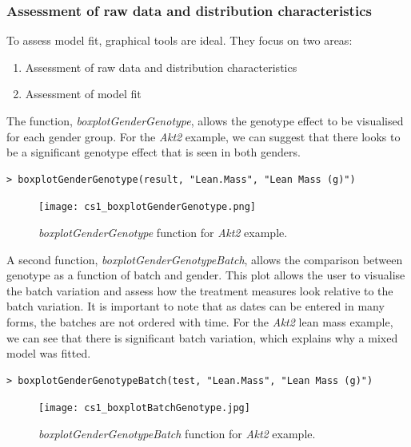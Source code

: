 \documentclass[12pt,a4paper]{article}
\begin{document}
\subsubsection{Assessment of raw data and distribution characteristics}
To assess model fit, graphical tools are ideal.  They focus on two areas:
\begin{enumerate}
 \item Assessment of raw data and distribution characteristics
 \item Assessment of model fit
\end{enumerate}
\label{AssesingModelFit}

The function, \textit{boxplotGenderGenotype}, allows the genotype effect to be visualised for each gender group. 
For the \textit{Akt2} example, we can suggest that there looks to be a significant genotype effect that is seen in both genders. 
\begingroup
    \fontsize{8pt}{12pt}\selectfont
\begin{verbatim}
> boxplotGenderGenotype(result, "Lean.Mass", "Lean Mass (g)")
\end{verbatim}
\endgroup 

\begin{figure}[H]%
\centerline{\texttt{[image: cs1\_boxplotGenderGenotype.png]}}
\caption{\textit{boxplotGenderGenotype} function for \textit{Akt2} example.}\label{fig:15}
\end{figure}

A second function, \textit{boxplotGenderGenotypeBatch}, allows the comparison between genotype as a function of batch and gender.  
This plot allows the user to visualise the batch variation and assess how the treatment measures look relative to the batch variation. 
It is important to note that as dates can be entered in many forms, the batches are not ordered with time. 
For the \textit{Akt2} lean mass example, we can see that there is significant batch variation, which explains why a mixed model was fitted.

\begingroup
    \fontsize{8pt}{12pt}\selectfont
\begin{verbatim}
> boxplotGenderGenotypeBatch(test, "Lean.Mass", "Lean Mass (g)")
\end{verbatim}
\endgroup 

\begin{figure}[H]%
\centerline{\texttt{[image: cs1\_boxplotBatchGenotype.jpg]}}
\caption{\textit{boxplotGenderGenotypeBatch} function for \textit{Akt2} example.}\label{fig:16}
\end{figure}
\end{document}
